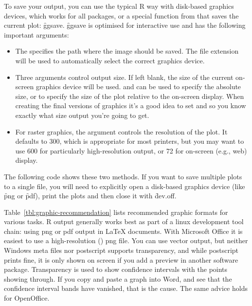 To save your output, you can use the typical R way with disk-based graphics devices, which works for all packages, or a special function from \ggplot that saves the current plot: \f{ggsave}. \f{ggsave} is optimised for interactive use and has the following important arguments: 

\begin{itemize}
  \item The  specifies the path where the image should be saved.  The file extension will be used to automatically select the correct graphics device.
  
  \item Three arguments control output size.  If left blank, the size of the current on-screen graphics device will be used.   and  can be used to specify the absolute size, or  to specify the size of the plot relative to the on-screen display.  When creating the final versions of graphics it's a good idea to set  and  so you know exactly what size output you're going to get.

  \item For raster graphics, the  argument controls the resolution of the plot. It defaults to 300, which is appropriate for most printers, but you may want to use 600 for particularly high-resolution output, or 72 for on-screen (e.g., web) display.
  
\end{itemize}

The following code shows these two methods. If you want to save multiple plots to a single file, you will need to explicitly open a disk-based graphics device (like \f{png} or \f{pdf}), print the plots and then close it with \f{dev.off}.

% 
% 


Table~\ref{tbl:graphic-recommendation} lists recommended graphic formats for various tasks.  R output generally works best as part of a linux development tool chain: using png or pdf output in \LaTeX{} documents.  With Microsoft Office it is easiest to use a high-resolution () png file.  You can use vector output, but neither Windows meta files nor postscript supports transparency, and while postscript prints fine, it is only shown on screen if you add a preview in another software package. Transparency is used to show confidence intervals with the points showing through. If you copy and paste a graph into Word, and see that the confidence interval bands have vanished, that is the cause. The same advice holds for OpenOffice.  

